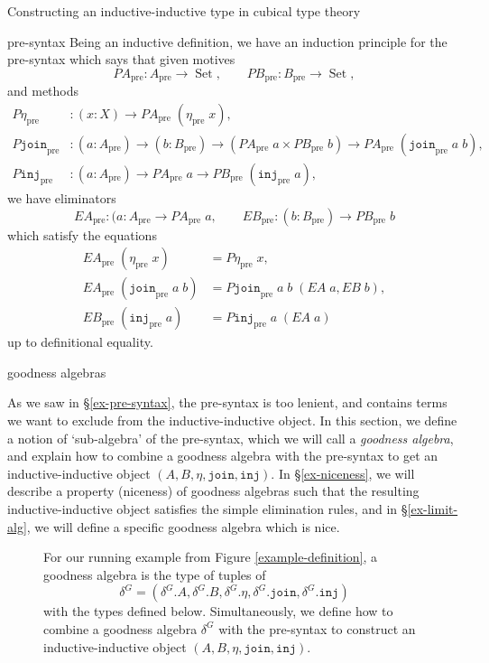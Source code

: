 \documentclass[acmsmall,review]{acmart}\settopmatter{printfolios=true,printccs=false,printacmref=false}
\DeclareMathOperator{\USet}{Set}
\newcommand{\pre}[1]{{#1}_\text{pre}}
\newcommand{\join}{\texttt{join}}
\newcommand{\inj}{\texttt{inj}}
\begin{document}
\begin{section}{Constructing an inductive-inductive type in cubical type theory}
\begin{subsection}{pre-syntax}
Being an inductive definition, we have an induction principle for the pre-syntax which says that given motives \[\pre{PA} : \pre{A} \to \USet,\qquad \pre{PB} : \pre{B} \to \USet,\] and methods \begin{align*}\pre{P\eta} &: (x : X) \to \pre{PA}\;(\pre{\eta}\;x),\\ \pre{P\join} &: (a : \pre{A}) \to (b : \pre{B}) \to (\pre{PA}\;a \times \pre{PB}\;b) \to \pre{PA}\;(\pre{\join}\;a\;b),\\ \pre{P\inj} &: (a : \pre{A}) \to \pre{PA}\;a \to \pre{PB}\;(\pre{\inj}\;a),\end{align*}
we have eliminators \[\pre{EA} : (a : \pre{A} \to \pre{PA}\;a,\qquad \pre{EB} : (b : \pre{B}) \to \pre{PB}\;b\] which satisfy the equations \begin{align*}\pre{EA}\;(\pre{\eta}\;x) &= \pre{P\eta}\;x,\\\pre{EA}\;(\pre{\join}\;a\;b) &= \pre{P\join}\;a\;b\;(EA\;a, EB\;b),\\ \pre{EB}\;(\pre{\inj}\;a) &= \pre{P\inj}\;a\;(EA\;a)\end{align*} up to definitional equality.

\end{subsection}

\begin{subsection}{goodness algebras}\label{ex-goodness-algebra}

As we saw in \S\ref{ex-pre-syntax}, the pre-syntax is too lenient, and contains terms we want to exclude from the inductive-inductive object. In this section, we define a notion of `sub-algebra' of the pre-syntax, which we will call a \emph{goodness algebra}, and explain how to combine a goodness algebra with the pre-syntax to get an inductive-inductive object $(A, B, \eta, \join, \inj)$. In \S\ref{ex-niceness}, we will describe a property (niceness) of goodness algebras such that the resulting inductive-inductive object satisfies the simple elimination rules, and in \S\ref{ex-limit-alg}, we will define a specific goodness algebra which is nice.

\begin{figure}[htpb]\begin{flushleft}

For our running example from Figure \ref{example-definition}, a goodness algebra is the type of tuples of \[\delta^G = (\delta^G.A, \delta^G.B, \delta^G.\eta, \delta^G.\join, \delta^G.\inj)\] with the types defined below. Simultaneously, we define how to combine a goodness algebra $\delta^G$ with the pre-syntax to construct an inductive-inductive object $(A, B, \eta, \join, \inj)$.


\end{flushleft}
\end{figure}
\end{subsection}
\end{section}
\end{document}
